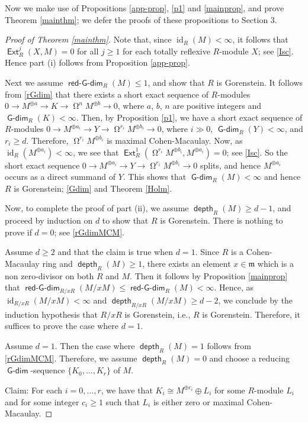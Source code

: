 \documentclass{amsart}
\theoremstyle{plain} %
\theoremstyle{definition}
\newcommand{\fm}{\mathfrak{m}}
\DeclareMathOperator{\id}{id}
\def\Ext{\operatorname{\mathsf{Ext}}}
\def\depth{\operatorname{\mathsf{depth}}}
\DeclareMathOperator{\Gdim}{\mathsf{G-dim}}
\DeclareMathOperator{\rGdim}{\operatorname{\mathsf{red-G-dim}}}
\DeclareMathOperator{\syz}{\Omega}
\begin{document}
Now we make use of Propositions \ref{app-prop}, \ref{p1} and \ref{mainprop}, and prove Theorem \ref{mainthm}; we defer the proofs of these propositions to Section 3. 

\begin{proof}[Proof of Theorem \ref{mainthm}] Note that, since $\id_R(M)<\infty$, it follows that $\Ext^j_R(X, M)=0$ for all $j\geq 1$ for each totally reflexive $R$-module $X$; see \ref{Isc}.
Hence part (i) follows from Proposition \ref{app-prop}.

Next we assume $\rGdim_R(M)\leq 1$, and show that $R$ is Gorenstein. It follows from \ref{rGdim} that there exists a short exact sequence of $R$-modules $0\to M^{\oplus a} \to K \to \syz^{n} M^{\oplus b} \to 0$, where $a$, $b$, $n$ are positive integers and $\Gdim_R(K)<\infty$. Then, by Proposition \ref{p1}, we have a short exact sequence of $R$-modules $0\to M^{\oplus a_i} \to Y \to \syz^{r_i} M^{\oplus b_i} \to 0$, where $i\gg 0$, $\Gdim_R(Y)<\infty$, and $r_i\geq d$. Therefore, $\syz^{r_i} M^{\oplus b_i}$ is maximal Cohen-Macaulay. Now, as $\id_R(M^{\oplus a_i})<\infty$, we see that $\Ext^1_R(\syz^{r_i} M^{\oplus b_i} ,M^{\oplus a_i})=0$; see \ref{Isc}. So the short exact sequence $0\to M^{\oplus a_i} \to Y \to \syz^{r_i} M^{\oplus b_i} \to 0$ splits, and hence $M^{\oplus a_i}$ occurs as a direct summand of 
$Y$. This shows that $\Gdim_R(M)<\infty$ and hence $R$ is Gorenstein; \ref{Gdim} and Theorem \ref{Holm}.

Now, to complete the proof of part (ii), we assume $\depth_R(M)\geq d-1$, and proceed by induction on $d$ to show that $R$ is Gorenstein. There is nothing to prove if $d=0$; see \ref{rGdimMCM}. 

Assume $d\geq 2$ and that the claim is true when $d=1$. Since $R$ is a Cohen-Macaulay ring and $\depth_R(M)\geq 1$, there exists an element $x\in \fm$ which is a non zero-divisor on both $R$ and $M$. Then it follows by Proposition \ref{mainprop} that $\rGdim_{R/xR}(M/xM)\leq \rGdim_R(M)<\infty$. Hence, as $\id_{R/xR}(M/xM)<\infty$ and $\depth_{R/xR}(M/xM)\geq d-2$, we conclude by the induction hypothesis that $R/xR$ is Gorenstein, i.e., $R$ is Gorenstein. Therefore, it suffices to prove the case where $d=1$.
 
Assume $d=1$. Then the case where $\depth_R(M)=1$ follows from \ref{rGdimMCM}. Therefore, we assume $\depth_R(M)=0$ and choose a reducing $\Gdim$-sequence $\{K_0, \ldots, K_r\}$ of $M$. 

Claim: For each $i=0, \ldots, r$, we have that $K_i \cong M^{\oplus c_i} \oplus L_i$ for some $R$-module $L_i$ and for some integer $c_i\geq 1$ such that $L_i$ is either zero or maximal Cohen-Macaulay. 


\end{proof}
\end{document}
